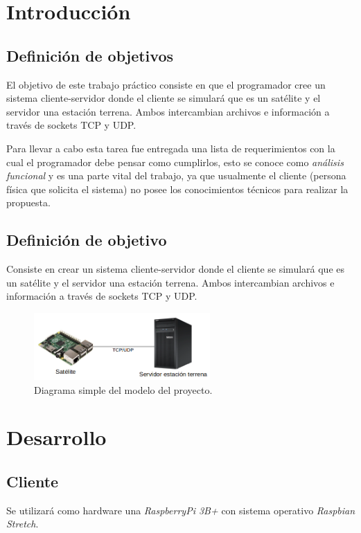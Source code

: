\documentclass[a4paper]{article}
\begin{document}
\tableofcontents

\clearpage

\section{Introducción}

\subsection{Definición de objetivos}
El objetivo de este trabajo práctico consiste en que el programador cree un sistema cliente-servidor donde el cliente se simulará que es un satélite y el servidor una estación terrena. Ambos intercambian archivos e información a través de sockets TCP y UDP.

Para llevar a cabo esta tarea fue entregada una lista de requerimientos con la cual el programador debe pensar como cumplirlos, esto se conoce como \textit{análisis funcional} y es una parte vital del trabajo, ya que usualmente el cliente (persona física que solicita el sistema) no posee los conocimientos técnicos para realizar la propuesta.

\subsection{Definición de objetivo}
Consiste en crear un sistema cliente-servidor donde el cliente se simulará que es un satélite y el servidor una estación terrena. Ambos intercambian archivos e información a través de sockets TCP y UDP.

\begin{figure}[H]
	\begin{center}				
	\includegraphics[width=0.6\textwidth]{rpserver.png}
  	\caption{Diagrama simple del modelo del proyecto.}
  	\end{center}
\end{figure}

\section{Desarrollo}
\subsection{Cliente}
Se utilizará como hardware una \textit{RaspberryPi 3B+} con sistema operativo \textit{Raspbian Stretch}.
\end{document}
